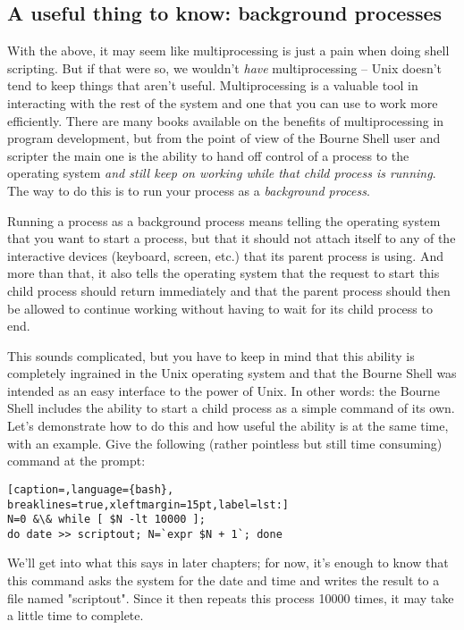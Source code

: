 \subsection{A useful thing to know: background processes}
With the above, it may seem like multiprocessing is just a pain when doing
shell scripting. But if that were so, we wouldn't \textit{have} multiprocessing
-- Unix doesn't tend to keep things that aren't useful. Multiprocessing is a
valuable tool in interacting with the rest of the system and one that you can
use to work more efficiently. There are many books available on the benefits of
multiprocessing in program development, but from the point of view of the
Bourne Shell user and scripter the main one is the ability to hand off control
of a process to the operating system \textit{and still keep on working while
that child process is running}. The way to do this is to run your process as a
\textit{background process}.

Running a process as a background process means telling the operating system
that you want to start a process, but that it should not attach itself to any
of the interactive devices (keyboard, screen, etc.) that its parent process is
using. And more than that, it also tells the operating system that the request
to start this child process should return immediately and that the parent
process should then be allowed to continue working without having to wait for
its child process to end.

This sounds complicated, but you have to keep in mind that this ability is
completely ingrained in the Unix operating system and that the Bourne Shell was
intended as an easy interface to the power of Unix. In other words: the Bourne
Shell includes the ability to start a child process as a simple command of its
own. Let's demonstrate how to do this and how useful the ability is at the same
time, with an example. Give the following (rather pointless but still time
consuming) command at the prompt:
\lstset{basicstyle=\scriptsize, numbers=left, captionpos=b, tabsize=4}
\begin{lstlisting}[caption=,language={bash},
breaklines=true,xleftmargin=15pt,label=lst:]
N=0 &\& while [ $N -lt 10000 ];
do date >> scriptout; N=`expr $N + 1`; done
\end{lstlisting}

We'll get into what this says in later chapters; for now, it's enough to know
that this command asks the system for the date and time and writes the result
to a file named "scriptout". Since it then repeats this process 10000 times, it
may take a little time to complete.


